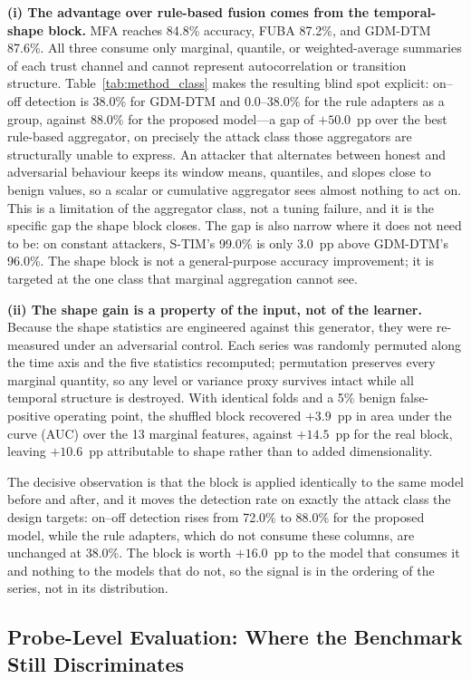 \documentclass[notspecified,article,submit,moreauthors]{Definitions/mdpi}
\begin{document}
\textbf{(i) The advantage over rule-based fusion comes from the temporal-shape block.} MFA reaches 84.8\% accuracy, FUBA 87.2\%, and GDM-DTM 87.6\%. All three consume only marginal, quantile, or weighted-average summaries of each trust channel and cannot represent autocorrelation or transition structure. Table~\ref{tab:method_class} makes the resulting blind spot explicit: on--off detection is 38.0\% for GDM-DTM and 0.0--38.0\% for the rule adapters as a group, against 88.0\% for the proposed model---a gap of $+50.0$~pp over the best rule-based aggregator, on precisely the attack class those aggregators are structurally unable to express. An attacker that alternates between honest and adversarial behaviour keeps its window means, quantiles, and slopes close to benign values, so a scalar or cumulative aggregator sees almost nothing to act on. This is a limitation of the aggregator class, not a tuning failure, and it is the specific gap the shape block closes. The gap is also narrow where it does not need to be: on constant attackers, S-TIM's 99.0\% is only 3.0~pp above GDM-DTM's 96.0\%. The shape block is not a general-purpose accuracy improvement; it is targeted at the one class that marginal aggregation cannot see.

\textbf{(ii) The shape gain is a property of the input, not of the learner.} Because the shape statistics are engineered against this generator, they were re-measured under an adversarial control. Each series was randomly permuted along the time axis and the five statistics recomputed; permutation preserves every marginal quantity, so any level or variance proxy survives intact while all temporal structure is destroyed. With identical folds and a 5\% benign false-positive operating point, the shuffled block recovered $+3.9$~pp in area under the curve (AUC) over the 13 marginal features, against $+14.5$~pp for the real block, leaving $+10.6$~pp attributable to shape rather than to added dimensionality.

The decisive observation is that the block is applied identically to the same model before and after, and it moves the detection rate on exactly the attack class the design targets: on--off detection rises from 72.0\% to 88.0\% for the proposed model, while the rule adapters, which do not consume these columns, are unchanged at 38.0\%. The block is worth $+16.0$~pp to the model that consumes it and nothing to the models that do not, so the signal is in the ordering of the series, not in its distribution.

\subsection{Probe-Level Evaluation: Where the Benchmark Still Discriminates}
\label{sec:probe}
\end{document}
